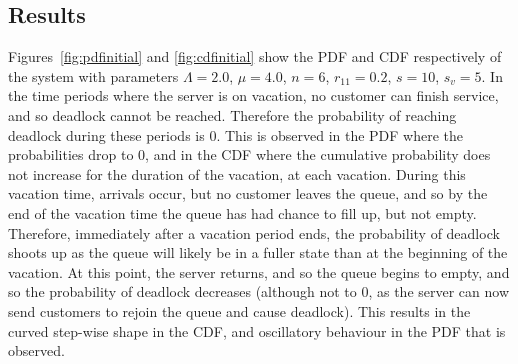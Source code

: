 \documentclass{article}
\begin{document}
\subsection{Results}

Figures~\ref{fig:pdfinitial} and \ref{fig:cdfinitial} show the PDF and CDF respectively of the system with parameters $\Lambda = 2.0$, $\mu = 4.0$, $n = 6$, $r_{11} = 0.2$, $s = 10$, $s_v = 5$.
In the time periods where the server is on vacation, no customer can finish service, and so deadlock cannot be reached.
Therefore the probability of reaching deadlock during these periods is $0$.
This is observed in the PDF where the probabilities drop to $0$, and in the CDF where the cumulative probability does not increase for the duration of the vacation, at each vacation.
During this vacation time, arrivals occur, but no customer leaves the queue, and so by the end of the vacation time the queue has had chance to fill up, but not empty.
Therefore, immediately after a vacation period ends, the probability of deadlock shoots up as the queue will likely be in a fuller state than at the beginning of the vacation.
At this point, the server returns, and so the queue begins to empty, and so the probability of deadlock decreases (although not to $0$, as the server can now send customers to rejoin the queue and cause deadlock).
This results in the curved step-wise shape in the CDF, and oscillatory behaviour in the PDF that is observed.
\end{document}

